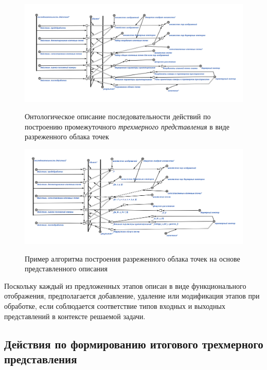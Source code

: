 \begin{figure}[H]
    \caption{Онтологическое описание последовательности действий по построению промежуточного \textit{трехмерного представления} в виде разреженного облака точек}
    \includegraphics[scale=0.8, width=1.0\textwidth]{author/part4/figures/reconstruction.png}
    \label{fig:reconstruction}
\end{figure}

\begin{figure}[H]
    \caption{Пример алгоритма построения разреженного облака точек на основе представленного описания}
    \includegraphics[scale=0.8, width=1.0\textwidth]{author/part4/figures/reconstruction-example.png}
    \label{fig:reconstruction-example}
\end{figure}

Поскольку каждый из предложенных этапов описан в виде функционального отображения, предполагается добавление, удаление или модификация этапов при обработке, если соблюдается соответствие типов входных и выходных представлений в контексте решаемой задачи.

\subsection{Действия по формированию итогового трехмерного представления}
\label{sec_3d_models_actions_final}

